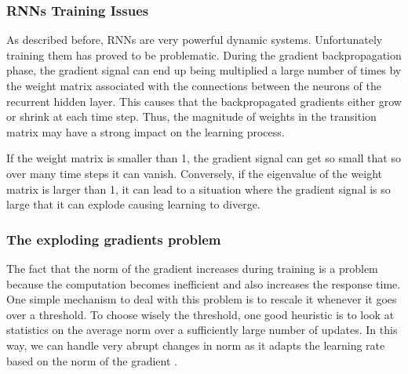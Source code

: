 

\subsubsection{RNNs Training Issues}
As described before, RNNs are very powerful dynamic systems. Unfortunately training them has proved to be problematic. During the gradient backpropagation phase, the gradient signal can end up being multiplied a large number of times by the weight matrix associated with the connections between the neurons of the recurrent hidden layer. This causes that the backpropagated gradients either grow or shrink at each time step. Thus, the magnitude of weights in the transition matrix may have a strong impact on the learning process.

If the  weight matrix is smaller than 1, the gradient signal can get so small that so over many time steps it can vanish. Conversely, if the eigenvalue of the weight matrix is larger than 1, it can lead to a situation where the gradient signal is so large that it can explode causing learning to diverge. 


\subsubsection*{The exploding gradients problem}
 The fact that the norm of the gradient increases during training is a problem because the computation becomes inefficient and also increases the response time. One simple mechanism to deal with this problem is to rescale it whenever it goes over a threshold. To choose wisely the threshold, one good heuristic is to look at statistics on the average norm over a sufficiently large number of updates. In this way, we can handle very abrupt changes in norm as it adapts the learning rate based on the norm of the gradient  \cite{pascanu2013difficulty}.

